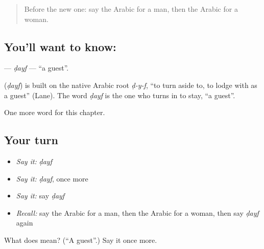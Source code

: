 \label{lesson:AR-C56-dayf}



\begin{quote}
Before the new one: say the Arabic for a man, then the Arabic for a woman.
\end{quote}

\subsection*{You'll want to know: }
\textbf{} — \emph{ḍayf} — \textquotedblleft{}a guest\textquotedblright{}.

\begin{cousinweb}
\textbf{} (\emph{ḍayf}) is built on the native Arabic root \emph{ḍ-y-f}, \textquotedblleft{}to turn aside to, to lodge with as a guest\textquotedblright{} (Lane). The word \emph{ḍayf} is the one who turns in to stay, \textquotedblleft{}a guest\textquotedblright{}.
\end{cousinweb}

\begin{grammarlens}[title={What you've built}]
One more word for this chapter.
\end{grammarlens}

\subsection*{Your turn}
\begin{itemize}
\raggedright
  \item \emph{Say it:} \emph{ḍayf}
  \item \emph{Say it:} \emph{ḍayf}, once more
  \item \emph{Say it:} say \emph{ḍayf}
  \item \emph{Recall:} say the Arabic for a man, then the Arabic for a woman, then say \emph{ḍayf} again
\end{itemize}

\begin{tcolorbox}[breakable,colback=teal!4,colframe=teal!35!black,title={Before you move on}]
What does  mean? (\textquotedblleft{}A guest\textquotedblright{}.) Say it once more.
\end{tcolorbox}
